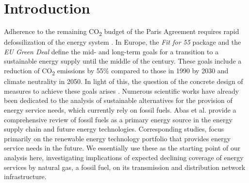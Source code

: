 \section{Introduction}
Adherence to the remaining CO\textsubscript{2} budget of the Paris Agreement requires rapid defossilization of the energy system \cite{rockstrom2017roadmap}. In Europe, the \textit{Fit for 55} package \cite{european_commission_european_2019} and the \textit{EU Green Deal} \cite{greendeal} define the mid- and long-term goals for a transition to a sustainable energy supply until the middle of the century. These goals include a reduction of CO\textsubscript{2} emissions by 55\% compared to those in 1990 by 2030 and climate neutrality in 2050. In light of this, the question of the concrete design of measures to achieve these goals arises \cite{hainsch2022energy}. Numerous scientific works have already been dedicated to the analysis of sustainable alternatives for the provision of energy service needs, which currently rely on fossil fuels. Abas et al. \cite{abas2015review} provide a comprehensive review of fossil fuels as a primary energy source in the energy supply chain and future energy technologies. Corresponding studies,   focus primarily on the renewable energy technology portfolio that provides energy service needs in the future. We essentially use these as the starting point of our analysis here, investigating implications of expected declining coverage of energy services by natural gas, a fossil fuel, on its transmission and distribution network infrastructure.\vspace{0.35cm}

